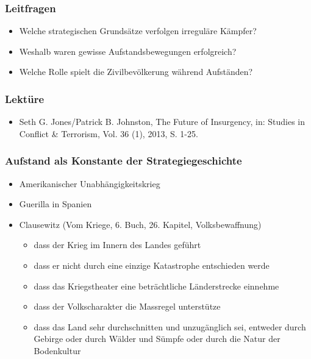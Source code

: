 {}\documentclass[a4paper]{article}
\providecommand{\tightlist}{\setlength{\itemsep}{1mm}\setlength{\parskip}{1mm}}
\begin{document}
\subsubsection{Leitfragen}\label{leitfragen-4}

\begin{itemize}
	\tightlist
	\item
	      Welche strategischen Grundsätze verfolgen irreguläre Kämpfer?
	\item
	      Weshalb waren gewisse Aufstandsbewegungen erfolgreich?
	\item
	      Welche Rolle spielt die Zivilbevölkerung während Aufständen?
\end{itemize}

\subsubsection{Lektüre}\label{lektuxfcre-4}

\begin{itemize}
	\tightlist
	\item
	      Seth G. Jones/Patrick B. Johnston, The Future of Insurgency, in:
	      Studies in Conﬂict \& Terrorism, Vol. 36 (1), 2013, S. 1-25.
\end{itemize}

\subsubsection{Aufstand als Konstante der
	Strategiegeschichte}\label{aufstand-als-konstante-der-strategiegeschichte}

\begin{itemize}
	\tightlist
	\item
	      Amerikanischer Unabhängigkeitskrieg
	\item
	      Guerilla in Spanien
	\item
	      Clausewitz (Vom Kriege, 6. Buch, 26. Kapitel, Volksbewaffnung)

	      \begin{itemize}
		      \tightlist
		      \item
		            dass der Krieg im Innern des Landes geführt
		      \item
		            dass er nicht durch eine einzige Katastrophe entschieden werde
		      \item
		            dass das Kriegstheater eine beträchtliche Länderstrecke einnehme
		      \item
		            dass der Volkscharakter die Massregel unterstütze
		      \item
		            dass das Land sehr durchschnitten und unzugänglich sei, entweder
		            durch Gebirge oder durch Wälder und Sümpfe oder durch die Natur der
		            Bodenkultur
	      \end{itemize}
\end{itemize}
\end{document}
